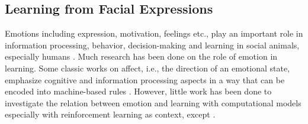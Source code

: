 \documentclass[10pt,journal,compsoc]{IEEEtran}
\begin{document}



\subsection{Learning from Facial Expressions} %

Emotions including expression, %
motivation, feelings etc., play an important role in information processing, behavior, decision-making and learning in social animals, especially humans \cite{scherer2001appraisal,picard2004affective,frijda2000beliefs,berridge2003pleasures}. %
Much research has been done on the role of emotion in learning. Some classic works on affect, i.e., the direction of an emotional state, emphasize cognitive and information processing aspects in a way that can be encoded into machine-based rules %
\cite{picard2004affective,ortony1990cognitive,csikszentmihalyi1991flow}. 
However, little work has been done to investigate the relation between emotion and learning with computational models especially with reinforcement learning as context, except \cite{gadanho2003learning,broekens2007emotion,veeriah2016face}.
\end{document}
